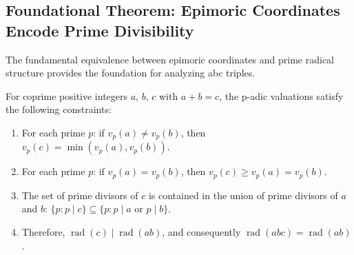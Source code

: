 \subsection{Foundational Theorem: Epimoric Coordinates Encode Prime Divisibility}
\label{subsec:epimoric-prime-foundation}

The fundamental equivalence between epimoric coordinates and prime radical structure provides the foundation for analyzing abc triples.

\begin{theorem}
\label{thm:padic-valuation-coprime-sum}
For coprime positive integers $a$, $b$, $c$ with $a + b = c$, the p-adic valuations satisfy the following constraints:

\begin{enumerate}
\item For each prime $p$: if $v_p(a) \neq v_p(b)$, then $v_p(c) = \min(v_p(a), v_p(b))$.
\item For each prime $p$: if $v_p(a) = v_p(b)$, then $v_p(c) \geq v_p(a) = v_p(b)$.
\item The set of prime divisors of $c$ is contained in the union of prime divisors of $a$ and $b$: $\{p : p \mid c\} \subseteq \{p : p \mid a \text{ or } p \mid b\}$.
\item Therefore, $\operatorname{rad}(c) \mid \operatorname{rad}(ab)$, and consequently $\operatorname{rad}(abc) = \operatorname{rad}(ab)$.
\end{enumerate}
\end{theorem}

